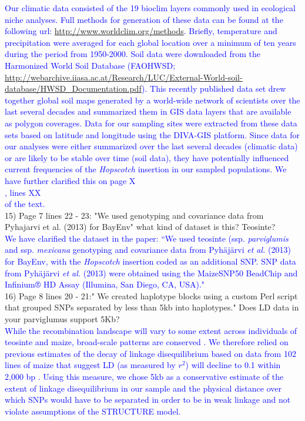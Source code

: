\documentclass[11pt]{article}
\newcommand{\res}[1]{\noindent \textcolor{blue}{{#1}} \\}
\newcommand{\mbh}[1]{\noindent \textcolor{Dandelion}{{#1}}\\}
\begin{document}
\res{Our climatic data consisted of the 19 bioclim layers commonly used in ecological niche analyses.  Full methods for generation of these data can be found at the following url: \url{http://www.worldclim.org/methods}.  Briefly, temperature and precipitation were averaged for each global location over a minimum of ten years during the period from 1950-2000.  Soil data were downloaded from the Harmonized World Soil Database (FAOHWSD; \url{http://webarchive.iiasa.ac.at/Research/LUC/External-World-soil-database/HWSD_Documentation.pdf}). This recently published data set drew together global soil maps generated by a world-wide network of scientists over the last several decades and summarized them in GIS data layers that are available as polygon coverages. Data for our sampling sites were extracted from these data sets based on latitude and longitude using the DIVA-GIS platform.  Since data for our analyses were either summarized over the last several decades (climatic data) or are likely to be stable over time (soil data), they have potentially influenced current frequencies of the \emph{Hopscotch} insertion in our sampled populations.  We have further clarified this on page \mbh{X}, lines \mbh{XX} of the text.} 

15) Page 7 lines 22 - 23: "We used genotyping and covariance data from Pyhajarvi et al. (2013) for BayEnv" what kind of dataset is this? Teosinte?\\ 

\res{We have clarified the dataset in the paper: ``We used teosinte (ssp. \emph{parviglumis} and ssp. \emph{mexicana} genotyping and covariance data from Pyh{\"a}j{\"a}rvi \emph{et al.} (2013) for BayEnv, with the \emph{Hopscotch} insertion coded as an additional SNP. SNP data from Pyh{\"a}j{\"a}rvi \emph{et al.} (2013) were obtained using the MaizeSNP50 BeadChip and Infinium® HD Assay (Illumina, San Diego, CA, USA)."}

16) Page 8 lines 20 - 21:" We created haplotype blocks using a custom Perl script that grouped SNPs separated by less than 5kb into haplotypes." Does LD data in your parviglumus support 5Kb?\\ 

\res{While the recombination landscape will vary to some extent across individuals of teosinte and maize, broad-scale patterns are conserved \citep{bauer2013}.  We therefore relied on previous estimates of the decay of linkage disequilibrium based on data from 102 lines of maize that suggest LD (as measured by $r^2$) will decline to 0.1 within 2,000 bp \citep{remington2001}.  Using this measure, we chose 5kb as a conservative estimate of the extent of linkage disequilibrium in our sample and the physical distance over which SNPs would have to be separated in order to be in weak linkage and not violate assumptions of the STRUCTURE model.}
\end{document}
